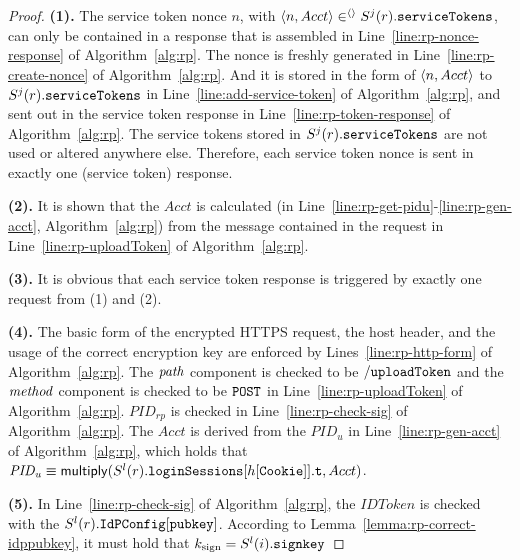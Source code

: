 \begin{theorem}
\begin{proof}
\textbf{(1).} The service token nonce $n$, with $\langle n, Acct\rangle \in^{\langle\rangle} S^j(r).\mathtt{serviceTokens}$, can only be contained in a response that is assembled in Line~\ref{line:rp-nonce-response} of Algorithm~\ref{alg:rp}. The nonce is freshly generated in Line~\ref{line:rp-create-nonce} of Algorithm~\ref{alg:rp}. And it is stored in the form of $\langle n, Acct\rangle$ to $S^j(r).\mathtt{serviceTokens}$ in Line~\ref{line:add-service-token} of Algorithm~\ref{alg:rp}, and sent out in the service token response in Line~\ref{line:rp-token-response} of Algorithm~\ref{alg:rp}. The service tokens stored in $S^j(r).\mathtt{serviceTokens}$ are not used or altered anywhere else. Therefore, each service token nonce is sent in exactly one (service token) response.

\textbf{(2).} It is shown that the $Acct$ is calculated (in Line~\ref{line:rp-get-pidu}-\ref{line:rp-gen-acct}, Algorithm~\ref{alg:rp}) from the message contained in the request in Line~\ref{line:rp-uploadToken} of Algorithm~\ref{alg:rp}. 

\textbf{(3).} It is obvious that each service token response is triggered by exactly one request from (1) and (2).

\textbf{(4).} The basic form of the encrypted HTTPS request, the host header, and the usage of the correct encryption key are enforced by Lines~\ref{line:rp-http-form} of Algorithm~\ref{alg:rp}. The $\mathit{path}$ component is checked to be $\mathtt{/uploadToken}$ and the $\mathit{method}$ component is checked to be $\mathtt{POST}$ in Line~\ref{line:rp-uploadToken} of Algorithm~\ref{alg:rp}. $PID_{rp}$ is checked in Line~\ref{line:rp-check-sig} of Algorithm~\ref{alg:rp}.  The $Acct$ is derived from the $PID_u$ in Line~\ref{line:rp-gen-acct} of Algorithm~\ref{alg:rp}, which holds that $\mathit{PID_{u}} \equiv \mathsf{multiply}(S^l(r).\mathtt{loginSessions}[h[\mathtt{Cookie}]].\mathtt{t}, Acct)$.

\textbf{(5).} In Line~\ref{line:rp-check-sig} of Algorithm~\ref{alg:rp}, the $IDToken$ is checked with the $S^l(r).\mathtt{IdPConfig}[\mathtt{pubkey}]$. According to Lemma~\ref{lemma:rp-correct-idppubkey}, it must hold that $k_\text{sign} = S^l(i).\mathtt{signkey}$
\end{proof}  
  
  


\end{theorem}
